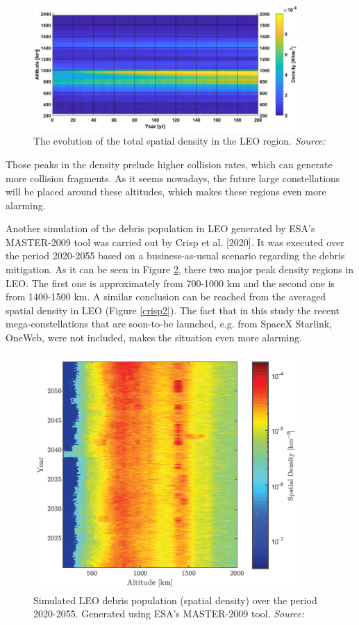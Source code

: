 \begin{figure}
\centering
\includegraphics[width=0.9\textwidth]{Images/Somma.png}\caption{The evolution of the total spatial density in the LEO region. \textit{Source: \cite{Somma 2019}}}
\label{Somma} 
\end{figure}

Those peaks in the density prelude higher collision rates, which can generate more collision fragments. As it seems nowadays, the future large constellations will be placed around these altitudes, which makes these regions even more alarming. \cite{Somma 2019}

Another simulation of the debris population in LEO generated by ESA's MASTER-2009 tool was carried out by Crisp et al. [2020]. It was executed over the period 2020-2055 based on a business-as-usual scenario regarding the debris mitigation. As it can be seen in Figure \ref{crisp1}, there two major peak density regions in LEO. The first one is approximately from 700-1000 km and the second one is from 1400-1500 km. A similar conclusion can be reached from the averaged spatial density in LEO (Figure \ref{crisp2}). The fact that in this study the recent mega-constellations that are soon-to-be launched, e.g. from SpaceX Starlink, OneWeb, were not included, makes the situation even more alarming. \cite{Crisp 2020}

\begin{figure}
\centering
\includegraphics[width=0.9\textwidth]{Images/crisp1.png}\caption{Simulated LEO debris population (spatial density) over the period 2020-2055. Generated using ESA's MASTER-2009 tool. \textit{Source: \cite{Crisp 2020}}}
\label{crisp1} 
\end{figure}

